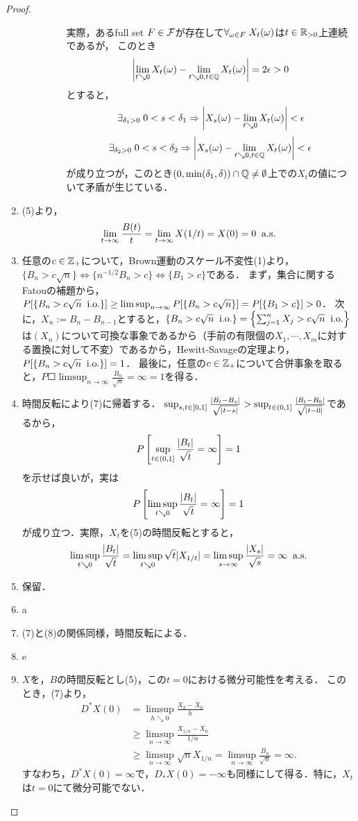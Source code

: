 \documentclass[uplatex,dvipdfmx]{jsreport}
\begin{document}
\begin{proof}
\begin{enumerate}
\begin{description}
\begin{enumerate}[(a)]
                実際，あるfull set $F\in\mathcal{F}$が存在して$\forall_{\omega\in F}\;X_t(\omega)$は$t\in\mathbb{R}_{>0}$上連続であるが，
                このとき\[\left|\lim_{t\searrow0}X_t(\omega)-\lim_{t\searrow 0,t\in\mathbb{Q}}X_t(\omega)\right|=2\epsilon>0\]とすると，
                \[\exists_{\delta_1>0}\;0<s<\delta_1\Rightarrow\left|X_s(\omega)-\lim_{t\searrow0}X_t(\omega)\right|<\epsilon\]
                \[\exists_{\delta_2>0}\;0<s<\delta_2\Rightarrow\left|X_s(\omega)-\lim_{t\searrow 0,t\in\mathbb{Q}}X_t(\omega)\right|<\epsilon\]
                が成り立つが，このとき$(0,\min(\delta_1,\delta))\cap\mathbb{Q}\ne\emptyset$上での$X_t$の値について矛盾が生じている．
            \end{enumerate}
        \end{description}
        \item (5)より，
        \[\lim_{t\to\infty}\frac{B(t)}{t}=\lim_{t\to\infty}X(1/t)=X(0)=0\;\;\mathrm{a.s.}\]
        \item 任意の$c\in\mathbb{Z}_+$について，Brown運動のスケール不変性(1)より，$\{B_n>c\sqrt{n}\}\Leftrightarrow\{n^{-1/2}B_n>c\}\Leftrightarrow\{B_1>c\}$である．
        まず，集合に関するFatouの補題から，$P[\left\{B_n>c\sqrt{n}\;\;\mathrm{i.o.}\right\}]\ge\limsup_{n\to\infty}P[\left\{B_n>c\sqrt{n}\right\}]=P[\left\{B_1>c\right\}]>0$．
        次に，$X_n:=B_n-B_{n-1}$とすると，$\left\{B_n>c\sqrt{n}\;\;\mathrm{i.o.}\right\}=\left\{\sum^n_{j=1}X_j>c\sqrt{n}\;\;\mathrm{i.o.}\right\}$は$(X_n)$について可換な事象であるから（手前の有限個の$X_1,\cdots,X_m$に対する置換に対して不変）であるから，Hewitt-Savageの定理より，$P[\left\{B_n>c\sqrt{n}\;\;\mathrm{i.o.}\right\}]=1$．
        最後に，任意の$c\in\mathbb{Z}_+$について合併事象を取ると，$P\Square{\limsup_{n\to\infty}\frac{B_n}{\sqrt{n}}=\infty}=1$を得る．
        \item 時間反転により(7)に帰着する．
        $\sup_{s,t\in[0,1]}\frac{\lvert B_t-B_s\rvert}{\sqrt{\lvert t-s\rvert}}>\sup_{t\in(0,1]}\frac{\lvert B_t-B_0\rvert}{\sqrt{\lvert t-0\rvert}}$であるから，
        \[P\left[\sup_{t\in(0,1]}\frac{\lvert B_t\rvert}{\sqrt{t}}=\infty\right]=1\]
        を示せば良いが，実は
        \[P\left[\limsup_{t\searrow0}\frac{\lvert B_t\rvert}{\sqrt{t}}=\infty\right]=1\]
        が成り立つ．実際，$X_t$を(5)の時間反転とすると，
        \[\limsup_{t\searrow0}\frac{\lvert B_t\rvert}{\sqrt{t}}=\limsup_{t\searrow0}\sqrt{t}\lvert X_{1/t}\rvert=\limsup_{s\to\infty}\frac{\lvert X_s\rvert}{\sqrt{s}}=\infty\;\;\mathrm{a.s.}\]
        \item 保留．
        \item a
        \item (7)と(8)の関係同様，時間反転による．
        \item e
        \item $X$を，$B$の時間反転とし(5)，この$t=0$における微分可能性を考える．
        このとき，(7)より，
        \begin{align*}
            D^*X(0)&=\limsup_{h\searrow0}\frac{X_h-X_0}{h}\\
            &\ge\limsup_{n\to\infty}\frac{X_{1/n}-X_0}{1/n}\\
            &\ge\limsup_{n\to\infty}\sqrt{n}X_{1/n}=\limsup_{n\to\infty}\frac{B_n}{\sqrt{n}}=\infty.
        \end{align*}
        すなわち，$D^*X(0)=\infty$で，$D_*X(0)=-\infty$も同様にして得る．特に，$X_t$は$t=0$にて微分可能でない．
        

\end{enumerate}
\end{proof}
\end{document}
